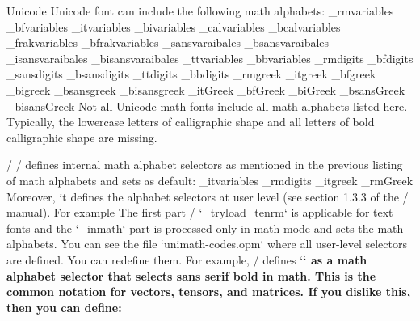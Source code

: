 \new Unicode
Unicode font can include the following math alphabets:
\begtt \typosize[9/11]
\_rmvariables      %
\_bfvariables      %
\_itvariables      %
\_bivariables      %
\_calvariables     %
\_bcalvariables    %
\_frakvariables    %
\_bfrakvariables   %
\_sansvaraibales   %
\_bsansvaraibales  %
\_isansvaraibales  %
\_bisansvaraibales %
\_ttvariables      %
\_bbvariables      %
\_rmdigits         %
\_bfdigits         %
\_sansdigits       %
\_bsansdigits      %
\_ttdigits         %
\_bbdigits         %
\_rmgreek          %
\_itgreek          %
\_bfgreek          %
\_bigreek          %
\_bsansgreek       %
\_bisansgreek      %
\_itGreek          %
\_bfGreek          %
\_biGreek          %
\_bsansGreek       %
\_bisansGreek      %
\endtt
%
Not all Unicode math fonts include all math alphabets listed here. Typically,
the lowercase letters of calligraphic shape and all letters of
bold calligraphic shape are missing.

\new \OpTeX/
\OpTeX/ defines internal math alphabet selectors as mentioned in the
previous listing of math alphabets and sets as default:
\begtt \typosize[10/12]
\_itvariables \_rmdigits \_itgreek \_rmGreek
\endtt
%
Moreover, it defines the alphabet selectors at user level (see section 1.3.3
of the \OpTeX/ manual). For example
\begtt \typosize[10/12]
\def\rm {\_tryload\_tenrm \_inmath{\_rmavariables \_rmdigits}}
\endtt
%
The first part
\new \OpTeX/
`\_tryload\_tenrm` is applicable for text fonts and the
`\_inmath` part is processed only in math mode and sets the math alphabets.
You can see the file `unimath-codes.opm` where all user-level selectors are
defined. You can redefine them. For example, \OpTeX/ defines `\bf` as a math
alphabet selector that selects sans serif bold in math. This is the common
notation for vectors, tensors, and matrices. If you dislike this, then you can define:
\begtt \typosize[10/12]
\def\bf {\_tryloadbf\_tenbf \_inmath{\_bfvariables\_bfdigits\_bfgreek\_bfGreek}}
\endtt


